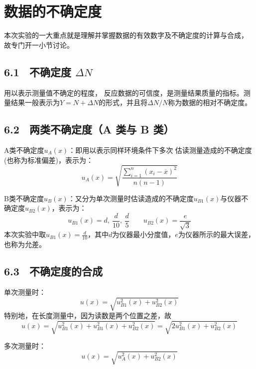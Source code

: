 \documentclass[UTF8]{article}
\theoremstyle{MyLineTheoremStyle} %
\theoremstyle{MyBlockTheoremStyle} %
\theoremstyle{MySubsubsectionStyle} %
\begin{document}
\section{数据的不确定度}

本次实验的一大重点就是理解并掌握数据的有效数字及不确定度的计算与合成，
故专门开一小节讨论。

\subsection*{6.1 \ 不确定度 $\Delta N$}

用以表示测量值不确定的程度，
反应数据的可信度，是测量结果质量的指标。测量结果一般表示为$Y=N+\Delta N$的形式，并且将$\Delta N/N$称为数据的相对不确定度。

\subsection*{6.2 \ 两类不确定度（A 类与 B 类）}


A类不确定度$u_A(x)$：即用以表示同样环境条件下多次
估读测量造成的不确定度(也称为标准偏差)，表示为：
\begin{equation}
   u_A(x)=\sqrt{\frac{\sum_{i=1}^n(x_i-\overline x)^2}{n(n-1)}}
\end{equation}

B类不确定度$u_B(x)$：又分为单次测量时估读造成的不确定度$u_{B1}(x)$与仪器不确定度$u_{B2}(x)$，表示为：
\begin{equation}
   u_{B1}(x)=d,\ \frac{d}{10},\ \frac{d}{5}\qquad u_{B2}(x)=\frac{e}{\sqrt 3} 
\end{equation}
本次实验中取$u_{B1}(x)=\frac{d}{10}$，其中$d$为仪器最小分度值，$e$为仪器所示的最大误差，也称为允差。

\subsection*{6.3 \ 不确定度的合成}


单次测量时：
\begin{equation}
    u(x)=\sqrt{u_{B1}^2(x)+u^2_{B2}(x)} 
\end{equation}
特别地，在长度测量中，因为读数是两个位置之差，故
\begin{equation}
    u(x)=\sqrt{u_{B1}^2(x)+u_{B1}^2(x)+u^2_{B2}(x)} =\sqrt{2u_{B1}^2(x)+u^2_{B2}(x)} 
\end{equation}

多次测量时：
\begin{equation}
   u(x)=\sqrt{u_A^2(x)+u^2_{B2}(x)} 
\end{equation}
\end{document}
